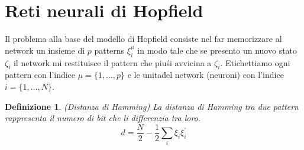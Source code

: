 \documentclass[12pt, a4paper]{book}
\theoremstyle{theorem}
\newtheorem{definition}{Definizione}[section]
\begin{document}
		\section{Reti neurali di Hopfield}
			Il problema alla base del modello di Hopfield consiste nel far memorizzare al network un insieme di $p$ patterns $\xi_i^\mu$ in modo tale che se presento un nuovo stato $\zeta_i$ il network mi restituisce il pattern che piu\' si avvicina a $\zeta_i$. Etichettiamo
			ogni pattern con l'indice $\mu = \{ 1, \dots, p\}$ e le unita\' del network (neuroni) con l'indice $i=\{1, \dots, N \}$.
			\begin{definition}(Distanza di Hamming)
			La distanza di Hamming tra due pattern rappresenta il numero di bit che li differenzia tra loro.
			\begin{equation*}
				d = \frac{N}{2} - \frac{1}{2} \sum_i \xi_i \xi_i^\prime
			\end{equation*}
			\end{definition}
\end{document}
